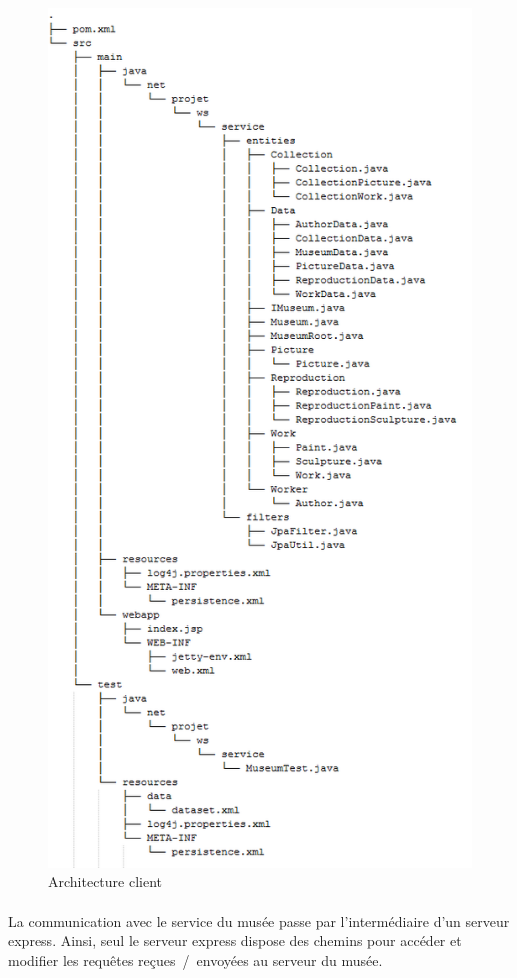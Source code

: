 \begin{figure}[ht]
\caption{\label{client} Architecture client}
\includegraphics[scale=0.65]{client}
\end{figure}


\paragraph{}
La communication avec le service du musée passe par l'intermédiaire d'un serveur express. Ainsi, seul le serveur express dispose des chemins pour accéder et modifier les requêtes reçues~/~envoyées au serveur du musée.